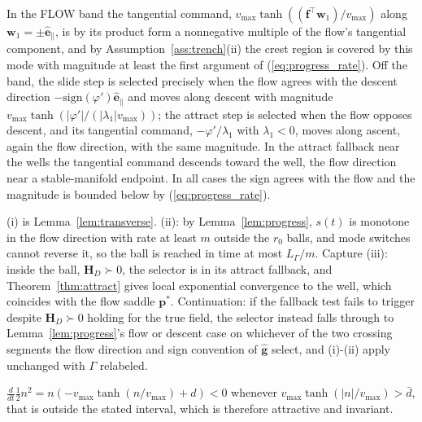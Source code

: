 \documentclass[lettersize,journal]{IEEEtran}
\begin{document}
\begin{IEEEproof}
In the FLOW band the tangential command,
$v_{\max}\tanh((\mathbf{f}^\top \mathbf{w}_1)/v_{\max})$ along
$\mathbf{w}_1 = \pm\hat{\mathbf{e}}_\parallel$, is by its product form
a nonnegative multiple of the flow's tangential component, and by
Assumption~\ref{ass:trench}(ii) the crest region is covered by this
mode with magnitude at least the first argument of
(\ref{eq:progress_rate}). Off the band, the slide step is selected
precisely when the flow agrees with the descent direction
$-\mathrm{sign}(\varphi')\hat{\mathbf{e}}_\parallel$ and moves along
descent with magnitude $v_{\max}\tanh(|\varphi'|/(|\lambda_1|
v_{\max}))$; the attract step is selected when the flow opposes
descent, and its tangential command, $-\varphi'/\lambda_1$ with
$\lambda_1 < 0$, moves along ascent, again the flow direction, with the
same magnitude. In the attract fallback near the wells the tangential
command descends toward the well, the flow direction near a
stable-manifold endpoint. In all cases the sign agrees with the flow
and the magnitude is bounded below by (\ref{eq:progress_rate}).
\end{IEEEproof}

\begin{IEEEproof}
(i) is Lemma~\ref{lem:transverse}. (ii): by Lemma~\ref{lem:progress},
$s(t)$ is monotone in the flow direction with rate at least $m$ outside
the $r_0$ balls, and mode switches cannot reverse it, so the ball is
reached in time at most $L_\Gamma/m$. Capture (iii): inside the ball,
$\mathbf{H}_D \succ 0$, the selector is in its attract fallback, and
Theorem~\ref{thm:attract} gives local exponential convergence to the
well, which coincides with the flow saddle $\mathbf{p}^*$. Continuation:
if the fallback test fails to trigger despite $\mathbf{H}_D \succ 0$
holding for the true field, the selector instead falls through to
Lemma~\ref{lem:progress}'s flow or descent case on whichever of the two
crossing segments the flow direction and sign convention of
$\hat{\mathbf{g}}$ select, and (i)-(ii) apply unchanged with $\Gamma$
relabeled.
\end{IEEEproof}

\begin{IEEEproof}
$\tfrac{d}{dt}\tfrac{1}{2}n^2 = n(-v_{\max}
\tanh(n/v_{\max}) + d) < 0$ whenever $v_{\max}\tanh(|n|/v_{\max}) >
\bar{d}$, that is outside the stated interval, which is therefore
attractive and invariant.
\end{IEEEproof}
\end{document}
